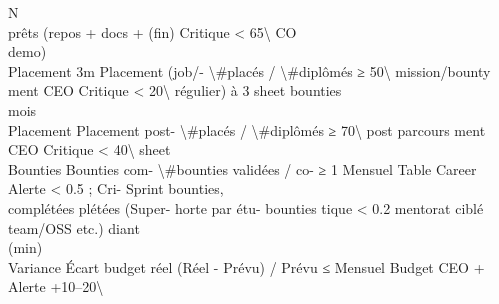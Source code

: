 \documentclass[12pt,landscape,a4paper]{article}
\begin{document}
\vspace{0.5em}
\vspace{0.5em}
\vspace{0.5em}
\vspace{0.5em}
N\\
prêts        (repos + docs +                                      (fin)                                 Critique \textless{} 65\textbackslash{}%
\vspace{0.5em}
\vspace{0.5em}
CO\\
demo)\\
Placement 3m Placement (job/-     \textbackslash{}#placés / \textbackslash{}#diplômés        ≥ 50\textbackslash{}%
mission/bounty                                                        ment       CEO      Critique \textless{} 20\textbackslash{}%
régulier) à 3                                                         sheet                                          bounties\\
mois\\
Placement    Placement post-      \textbackslash{}#placés / \textbackslash{}#diplômés        ≥ 70\textbackslash{}%
post         parcours                                                              ment       CEO      Critique \textless{} 40\textbackslash{}%
sheet\\
Bounties       Bounties com-      \textbackslash{}#bounties validées / co-   ≥ 1        Mensuel    Table      Career    Alerte \textless{} 0.5 ; Cri-       Sprint bounties,\\
complétées     plétées (Super-    horte                      par étu-              bounties             tique \textless{} 0.2               mentorat ciblé\\
team/OSS etc.)                                diant\\
(min)\\
Variance       Écart budget réel (Réel - Prévu) / Prévu      ≤     Mensuel         Budget     CEO +     Alerte +10–20\textbackslash{}%
\end{document}
